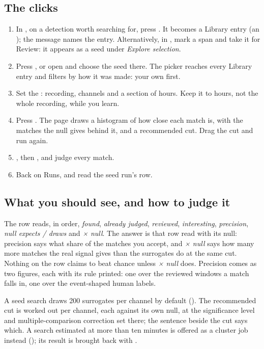 \subsection*{The clicks}
\begin{enumerate}
\item In , on a detection worth searching for, press . It
  becomes a Library entry (an ); the message names the entry.
  Alternatively, in , mark a span and take it for Review: it appears as
  a seed under \emph{Explore selection}.
\item Press , or open  and choose the
  seed there. The picker reaches every Library entry and filters by how it was made: your own
  first.
\item Set the : recording, channels and a section of hours. Keep it to hours, not the
  whole recording, while you learn.
\item Press . The page draws a histogram of how close each match is, with
  the matches the null gives behind it, and a recommended cut. Drag the cut and run again.
\item {}, then , and judge every match.
\item Back on Runs,  and read the seed run's row.
\end{enumerate}

\subsection*{What you should see, and how to judge it}
The row reads, in order, \emph{found}, \emph{already judged}, \emph{reviewed},
\emph{interesting}, \emph{precision}, \emph{null expects / draws} and \emph{× null}. The
answer is that row read with its null: precision says what share of the matches you accept,
and \emph{× null} says how many more matches the real signal gives than the surrogates do at
the same cut. Nothing on the row claims to beat chance unless \emph{× null} does. Precision
comes as two figures, each with its rule printed: one over the reviewed windows a match falls
in, one over the event-shaped human labels.

A seed search draws 200 surrogates per channel by default (). The
recommended cut is worked out per channel, each against its own null, at the significance
level and multiple-comparison correction set there; the sentence beside the cut says which.
A search estimated at more than ten minutes is offered as a cluster job instead
(); its result is brought back with .


